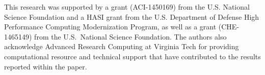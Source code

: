 This research was supported by a grant (ACI-1450169) from the U.S. National
Science Foundation and a HASI grant from the U.S. Department of Defense High
Performance Computing Modernization Program, as well as a grant (CHE-1465149)
from the U.S.\ National Science Foundation.  The authors also acknowledge
Advanced Research Computing at Virginia Tech for providing computational
resource and technical support that have contributed to the results reported
within the paper.

